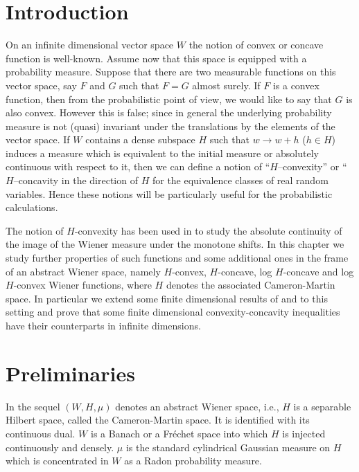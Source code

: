 \documentclass[12pt,a4paper]{book}
\begin{document}
\section*{Introduction}
On an infinite dimensional vector space $W$  the notion of convex or concave
function is well-known. Assume now that this space is equipped with a
probability measure. Suppose that there are two measurable functions  on
this vector space, say $F$ and $G$ such that $F=G$ almost surely. If
$F$ is a  convex function, then from the probabilistic point of view,
we would like to say  that $G$ is also convex. However this is false;  since
in general the underlying probability measure is not (quasi)
invariant under the translations by the elements of the vector
space. If $W$ contains a dense  subspace $H$ such that $w\to w+h$
($h\in H$) induces a measure which is equivalent to the initial
measure or absolutely continuous with respect to it, then   we can
define a  notion of ``$H$--convexity'' or ``$H$--concavity  in the
direction  of $H$ for the equivalence classes of real random
variables.  Hence these notions will be  particularly useful
for  the probabilistic calculations.

The notion of $H$-convexity  has
been used  in \cite{UZ7} to study the
absolute continuity of the image of the Wiener measure under the
monotone shifts. In this chapter we study further  properties of
such functions  and some additional ones  in the frame of an abstract
Wiener space, namely  $H$-convex, $H$-concave, log $H$-concave and log
$H$-convex Wiener functions,
where $H$ denotes the associated  Cameron-Martin space. In particular
we extend some finite dimensional results of  \cite{PRE71} and
\cite{BLI}  to this setting and prove that some finite dimensional
convexity-concavity inequalities have their counterparts in infinite
dimensions.
\section{Preliminaries}
In the sequel $(W,H,\mu)$ denotes an abstract Wiener space, i.e., $H$
is a separable Hilbert space, called the Cameron-Martin space.
It is identified with its continuous dual.  $W$
is a Banach or a Fr\'echet space into which $H$ is injected
continuously and densely. $\mu$ is the standard  cylindrical  Gaussian
measure on $H$ which is concentrated in $W$ as a Radon probability measure.
\end{document}
